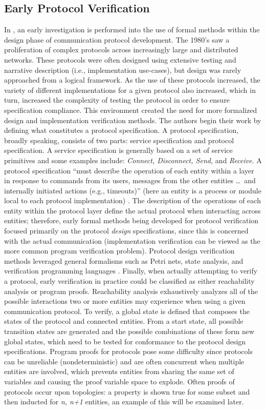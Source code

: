 \documentclass[11pt, journal]{IEEEtran}
\begin{document}
\subsection{Early Protocol Verification}
In \cite{Bochman1980}, an early investigation is performed into the use of formal methods within the design phase of communication protocol development. The 1980's saw a proliferation of complex protocols across increasingly large and distributed networks. These protocols were often designed using extensive testing and narrative description (i.e., implementation use-cases), but design was rarely approached from a logical framework. As the use of these protocols increased, the variety of different implementations for a given protocol also increased, which in turn, increased the complexity of testing the protocol in order to ensure specification compliance. This environment created the need for more formalized design and implementation verification methods. 
\bigbreak
The authors begin their work by defining what constitutes a protocol specification. A protocol specification, broadly speaking, consists of two parts: service specification and protocol specification. A service specification is generally based on a set of service primitives and some examples include: \textit{Connect, Disconnect, Send,} and \textit{Receive}. A protocol specification ``must describe the operation of each entity within a layer in response to commands from its users, messages from the other entities \ldots\ and internally initiated actions (e.g., timeouts)'' (here an entity is a process or module local to each protocol implementation) \cite{Bochman1980}. The description of the operations of each entity within the protocol layer define the actual protocol when interacting across entities; therefore, early formal methods being developed for protocol verification focused primarily on the protocol \textit{design} specifications, since this is concerned with the actual communication (implementation verification can be viewed as the more common program verification problem). Protocol design verification methods leveraged general formalisms such as Petri nets, state analysis, and verification programming languages \cite{Petri1966}. 
\bigbreak
Finally, when actually attempting to verify a protocol, early verification in practice could be classified as either reachability analysis or program proofs. Reachability analysis exhaustively analyzes all of the possible interactions two or more entities may experience when using a given communication protocol. To verify, a global state is defined that composes the states of the protocol and connected entities. From a start state, all possible transition states are generated and the possible combinations of these form new global states, which need to be tested for conformance to the protocol design specifications. Program proofs for protocols pose some difficulty since protocols can be unreliable (nondeterministic) and are often concurrent when multiple entities are involved, which prevents entities from sharing the same set of variables and causing the proof variable space to explode. Often proofs of protocols occur upon topologies: a property is shown true for some subset and then inducted for \textit{n, n+1} entities, an example of this will be examined later. 
\end{document}
